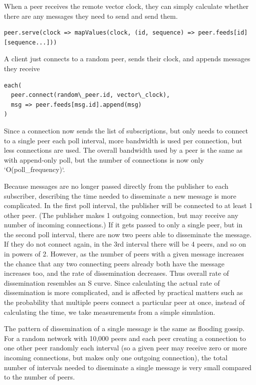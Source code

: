 \documentclass[sigconf]{acmart}
\begin{document}
When a peer receives the remote vector clock, they can simply
calculate whether there are any messages they need to send and send
them.

\begin{verbatim}
peer.serve(clock => mapValues(clock, (id, sequence) => peer.feeds[id][sequence...]))
\end{verbatim}

A client just connects to a random peer, sends their clock, and
appends messages they receive

\begin{verbatim}
each(
  peer.connect(random\_peer.id, vector\_clock),
  msg => peer.feeds[msg.id].append(msg)
)
\end{verbatim}

Since a connection now sends the list of subscriptions, but only needs
to connect to a single peer each poll interval, more bandwidth is used
per connection, but less connections are used.  The overall bandwidth
used by a peer is the same as with append-only poll, but the number of
connections is now only `O(poll\_frequency)`.

Because messages are no longer passed directly from the publisher to
each subscriber, describing the time needed to disseminate a new
message is more complicated.  In the first poll interval, the
publisher will be connected to at least 1 other peer.  (The publisher
makes 1 outgoing connection, but may receive any number of incoming
connections.)  If it gets passed to only a single peer, but in the
second poll interval, there are now two peers able to disseminate the
message. If they do not connect again, in the 3rd interval there will
be 4 peers, and so on in powers of 2. However, as the number of peers
with a given message increases the chance that any two connecting
peers already both have the message increases too, and the rate of
dissemination decreases. Thus overall rate of dissemination resembles
an S curve. Since calculating the actual rate of dissemination is more
complicated, and is affected by practical matters such as the
probability that multiple peers connect a particular peer at once,
instead of calculating the time, we take measurements from a simple
simulation.

The pattern of dissemination of a single message is the same as
flooding gossip.  For a random network with 10,000 peers and each peer
creating a connection to one other peer randomly each interval (so a
given peer may receive zero or more incoming connections, but makes
only one outgoing connection), the total number of intervals needed to
diseminate a single message is very small compared to the number of
peers.
\end{document}
